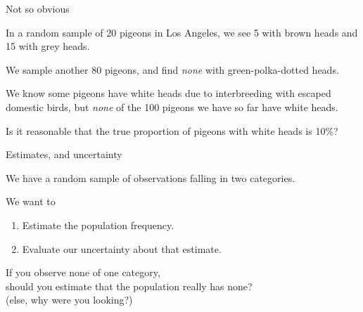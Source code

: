 \begin{frame}{Not so obvious}

    In a random sample of 20 pigeons in Los Angeles,
    we see 5 with brown heads and 15 with grey heads.\\

    \vspace{2em}

    \pause

    We sample another 80 pigeons, and find \emph{none} with green-polka-dotted heads.\\

    \vspace{2em}

    \pause

    We know some pigeons have white heads due to interbreeding with escaped domestic birds,
    but \emph{none} of the 100 pigeons we have so far have white heads.\\

    \vspace{1em}
    \pause

    \alert{Is it reasonable} that the true proportion of pigeons with white heads is 10\%?


\end{frame}

\begin{frame}{Estimates, and uncertainty}

    We have a random sample of observations falling in two categories.

    \vspace{2em}

    We want to
    \begin{enumerate}
        \item Estimate the population frequency.
        \item Evaluate our uncertainty about that estimate.
    \end{enumerate}

    \vspace{2em}

    If you observe \alert{none} of one category, \\
        should you estimate that the population really has none? \\
            \hspace{3em}   {\small (else, why were you looking?)}

\end{frame}

